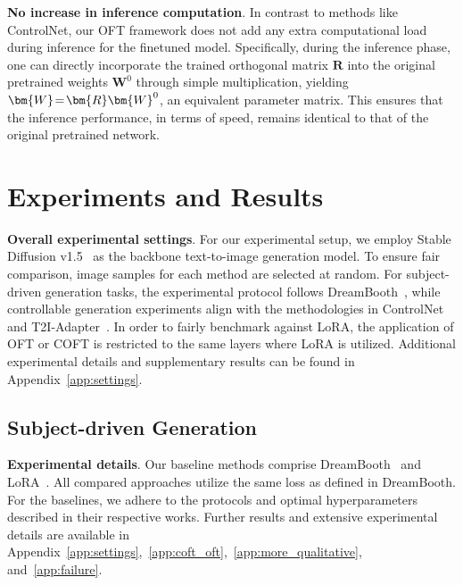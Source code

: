 \textbf{No increase in inference computation}. In contrast to methods like ControlNet, our OFT framework does not add any extra computational load during inference for the finetuned model. Specifically, during the inference phase, one can directly incorporate the trained orthogonal matrix $\bm{R}$ into the original pretrained weights $\bm{W}^0$ through simple multiplication, yielding $\thickmuskip=2mu \medmuskip=2mu \bm{W}=\bm{R}\bm{W}^0$, an equivalent parameter matrix. This ensures that the inference performance, in terms of speed, remains identical to that of the original pretrained network.

\section{Experiments and Results}

\textbf{Overall experimental settings}. For our experimental setup, we employ Stable Diffusion v1.5~\cite{rombach2022high} as the backbone text-to-image generation model. To ensure fair comparison, image samples for each method are selected at random. For subject-driven generation tasks, the experimental protocol follows DreamBooth~\cite{ruiz2023dreambooth}, while controllable generation experiments align with the methodologies in ControlNet~\cite{zhang2023adding} and T2I-Adapter~\cite{mou2023t2i}. In order to fairly benchmark against LoRA, the application of OFT or COFT is restricted to the same layers where LoRA is utilized. Additional experimental details and supplementary results can be found in Appendix~\ref{app:settings}.

\subsection{Subject-driven Generation}

\textbf{Experimental details}. Our baseline methods comprise DreamBooth~\cite{ruiz2023dreambooth} and LoRA~\cite{hulora2022}. All compared approaches utilize the same loss as defined in DreamBooth. For the baselines, we adhere to the protocols and optimal hyperparameters described in their respective works. Further results and extensive experimental details are available in Appendix~\ref{app:settings},~\ref{app:coft_oft},~\ref{app:more_qualitative}, and~\ref{app:failure}.

